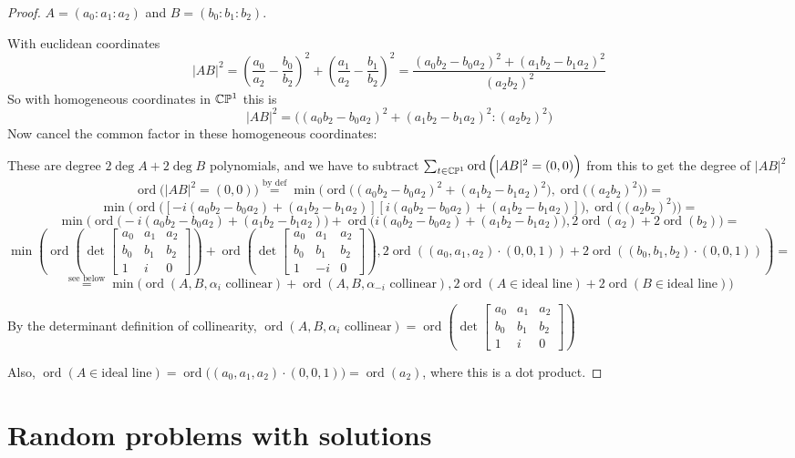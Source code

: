 \documentclass[a4paper]{article}
\newcommand{\ord}{\operatorname{ord}}
\begin{document}
\begin{proof}
$A=(a_0:a_1:a_2)$ and $B=(b_0:b_1:b_2)$.




With euclidean coordinates
$$|AB|^2=\left(\frac{a_0}{a_2}-\frac{b_0}{b_2}\right)^2+\left(\frac{a_1}{a_2}-\frac{b_1}{b_2}\right)^2=\frac{(a_0b_2-b_0a_2)^2+(a_1b_2-b_1a_2)^2}{(a_2b_2)^2}$$
So 
with homogeneous coordinates in $\mathbb{C}\mathbb{P}^1$ this is
$$|AB|^2=\big((a_0b_2-b_0a_2)^2+(a_1b_2-b_1a_2)^2:(a_2b_2)^2\big)$$
Now cancel the common factor in these homogeneous coordinates:

These are degree $2\deg A+2\deg B$ polynomials, and we have to subtract $\sum_{t\in\cc\pp^1}\ord\Big(|AB|^2=(0,0)\Big)$ from this to get the degree of $|AB|^2$
$$\ord\Big(|AB|^2=(0,0)\Big)\overset{\text{by def}}{=}\min\Big(\ord\big((a_0b_2-b_0a_2)^2+(a_1b_2-b_1a_2)^2\big), \ord\big((a_2b_2)^2\big)\Big)=$$
$$\min\Big(\ord\big([-i(a_0b_2-b_0a_2)+(a_1b_2-b_1a_2)][i(a_0b_2-b_0a_2)+(a_1b_2-b_1a_2)]\big), \ord\big((a_2b_2)^2\big)\Big)=$$
$$\min\Big(\ord\big(-i(a_0b_2-b_0a_2)+(a_1b_2-b_1a_2)\big)+\ord\big(i(a_0b_2-b_0a_2)+(a_1b_2-b_1a_2)\big), 2\ord(a_2)+2\ord(b_2)\Big)=$$
$$\min\left(\ord\left(\det
\begin{bmatrix}
a_0 & a_1 & a_2 \\
b_0 & b_1 & b_2 \\
1 & i & 0
\end{bmatrix}
\right)+\ord\left(\det
\begin{bmatrix}
a_0 & a_1 & a_2 \\
b_0 & b_1 & b_2 \\
1 & -i & 0
\end{bmatrix}
\right),
2\ord((a_0,a_1,a_2)\cdot(0,0,1))+2\ord((b_0,b_1,b_2)\cdot(0,0,1))\right)=$$
$$\overset{\text{see below}}{=}\min\Big(\ord(A,B,\alpha_i\text{ collinear})+\ord(A,B,\alpha_{-i}\text{ collinear}), 2\ord(A\in \text{ideal line})+2\ord(B\in \text{ideal line})\Big)$$

By the determinant definition of collinearity, $\ord(A,B,\alpha_i\text{ collinear})=\ord\left(\det
\begin{bmatrix}
a_0 & a_1 & a_2 \\
b_0 & b_1 & b_2 \\
1 & i & 0
\end{bmatrix}
\right)$

Also, $\ord(A\in \text{ideal line})=\ord\big((a_0,a_1,a_2)\cdot(0,0,1)\big)=\ord(a_2)$, where this is a dot product.
\end{proof}

\section{Random problems with solutions}
\end{document}
